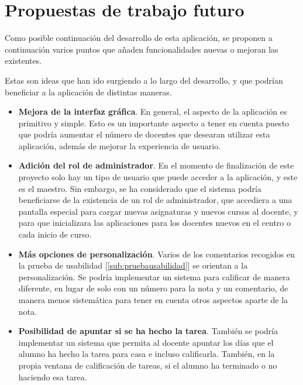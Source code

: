 \section{Propuestas de trabajo futuro}
\label{sec:trabajofuturo}
Como posible continuación del desarrollo de esta aplicación, se proponen a continuación varios puntos que añaden funcionalidades nuevas o mejoran las existentes.

Estas son ideas que han ido surgiendo a lo largo del desarrollo, y que podrían beneficiar a la aplicación de distintas maneras.

\begin{itemize}
	\item \textbf{Mejora de la interfaz gráfica}. En general, el aspecto de la aplicación es primitivo y simple. Esto es un importante aspecto a tener en cuenta puesto que podría aumentar el número de docentes que desearan utilizar esta aplicación, además de mejorar la experiencia de usuario.
	\item \textbf{Adición del rol de administrador}. En el momento de finalización de este proyecto solo hay un tipo de usuario que puede acceder a la aplicación, y este es el maestro. Sin embargo, se ha considerado que el sistema podría beneficiarse de la existencia de un rol de administrador, que accediera a una pantalla especial para cargar nuevas asignaturas y nuevos cursos al docente, y para que inicializara las aplicaciones para los docentes nuevos en el centro o cada inicio de curso.
	\item \textbf{Más opciones de personalización}. Varios de los comentarios recogidos en la prueba de usabilidad [\ref{sub:pruebausabilidad}] se orientan a la personalización. Se podría implementar un sistema para calificar de manera diferente, en lugar de solo con un número para la nota y un comentario, de manera menos sistemática para tener en cuenta otros aspectos aparte de la nota.
	\item \textbf{Posibilidad de apuntar si se ha hecho la tarea}. También se podría implementar un sistema que permita al docente apuntar los días que el alumno ha hecho la tarea para casa e incluso calificarla. También, en la propia ventana de calificación de tareas, si el alumno ha terminado o no haciendo esa tarea.
\end{itemize}
